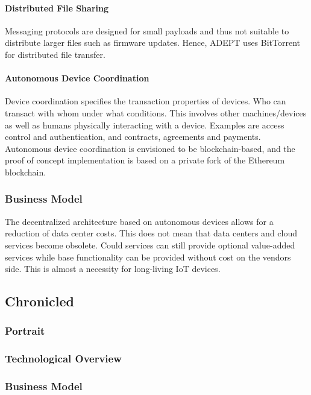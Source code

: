 \paragraph{Distributed File Sharing}

Messaging protocols are designed for small payloads and thus not suitable to distribute larger files such as firmware updates. Hence, ADEPT uses BitTorrent for distributed file transfer.

\paragraph{Autonomous Device Coordination}
Device coordination specifies the transaction properties of devices. Who can transact with whom under what conditions. This involves other machines/devices as well as humans physically interacting with a device. Examples are access control and authentication, and contracts, agreements and payments. Autonomous device coordination is envisioned to be blockchain-based, and the proof of concept implementation is based on a private fork of the Ethereum blockchain. 

\subsubsection{Business Model}

The decentralized architecture based on autonomous devices allows for a reduction of data center costs. This does not mean that data centers and cloud services become obsolete. Could services can still provide optional value-added services while base functionality can be provided without cost on the vendors side. This is almost a necessity for long-living IoT devices.

\subsection{Chronicled}

\subsubsection{Portrait}

\subsubsection{Technological Overview}

\subsubsection{Business Model}


